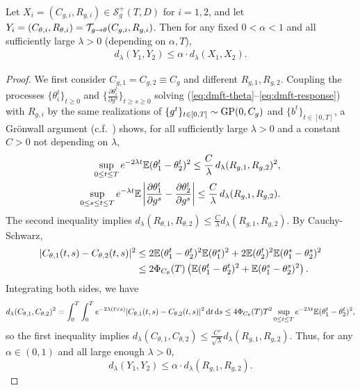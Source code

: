 \begin{lemma}\label{lem:contraction-Rtheta}
Let $X_i=(C_{g,i},R_{g,i})\in \mathcal{S}_{g}^+(T,D)$ for $i=1,2$, and let
$Y_i=(C_{\theta,i},R_{\theta,i})=\mathcal{T}_{g \to \theta}(C_{g,i},R_{g,i})$.
Then for any fixed $0<\alpha<1$ and all sufficiently large $\lambda>0$
(depending on $\alpha,T$),
\begin{align}\label{equation:contraction_Rfix}
d_\lambda(Y_1,Y_2) \leq \alpha\cdot d_\lambda(X_1,X_2).
\end{align}
\end{lemma}
\begin{proof}
We first consider $C_{g,1}=C_{g,2} \equiv C_g$ and different $R_{g,1},R_{g,2}$.
Coupling the processes $\{\theta_i^t\}_{t \geq 0}$ 
and $\{\frac{\partial \theta_i^t}{\partial g^s}\}_{t \geq s \geq 0}$ 
solving (\ref{eq:dmft-theta}--\ref{eq:dmft-response}) with $R_{g,i}$
by the same realizations of $\{g^t\}_{t \in [0,T]} \sim \operatorname{GP}(0,C_g)$ and
$\{b^t\}_{t \in [0,T]}$, a Gr\"onwall
argument (c.f.\ \cite[Lemma 3.7]{fan2025dynamicalI}) shows,
for all sufficiently large $\lambda>0$ and a constant $C>0$ not depending on
$\lambda$,
\begin{align*}
\sup_{0 \leq t \leq T} e^{-2\lambda t}\mathbb{E}(\theta_1^t-\theta_2^t)^2 \leq
\frac{C}{\lambda}\,d_\lambda(R_{g,1},R_{g,2})^2,\\
\sup_{0 \leq s \leq t \leq T}
e^{-\lambda t}
\mathbb{E} \left|\frac{\partial \theta_1^t}{\partial g^s} - \frac{\partial
\theta_2^t}{\partial g^s}\right| \leq \frac{C}{\lambda}
\,d_\lambda(R_{g,1},R_{g,2}).
\end{align*}
The second inequality implies
$d_\lambda(R_{\theta,1},R_{\theta,2}) \leq \frac{C}{\lambda}
d_\lambda (R_{g,1},R_{g,2})$. By Cauchy-Schwarz,
\begin{align*}
|C_{\theta,1}(t,s)-C_{\theta,2}(t,s)|^2 &\leq 2\mathbb{E}(\theta_1^t-\theta_2^t)^2\mathbb{E}(\theta_1^s)^2 + 2\mathbb{E}(\theta_2^t)^2\mathbb{E}(\theta_1^s-\theta_2^s)^2\\
&\leq 2\Phi_{C_\theta}(T)\left( \mathbb{E}(\theta_1^t-\theta_2^t)^2 + \mathbb{E}(\theta_1^s-\theta_2^s)^2 \right). \end{align*}
Integrating both sides, we have
\[d_{\lambda}(C_{\theta,1}, C_{\theta,2})^2
=\int_0^T\int_0^T e^{-2\lambda(t \vee s)}
|C_{\theta,1}(t,s)-C_{\theta,2}(t,s)|^2\,\mathrm{d} t\, \mathrm{d} s
\leq 4\Phi_{C_\theta}(T)T^2
\sup_{0 \leq t \leq T} e^{-2\lambda t}\mathbb{E}(\theta_1^t-\theta_2^t)^2,\]
so the first inequality implies 
$d_{\lambda}(C_{\theta,1},C_{\theta,2}) \leq \frac{C'}{\sqrt{\lambda}}
d_\lambda (R_{g, 1}, R_{g, 2})$. Thus, for any $\alpha \in (0,1)$ and all large
enough $\lambda>0$,
\begin{equation}\label{eq:contractionsameCg}
d_\lambda(Y_1,Y_2) \leq \alpha \cdot d_\lambda(R_{g,1},R_{g,2}).
\end{equation}


\end{proof}
